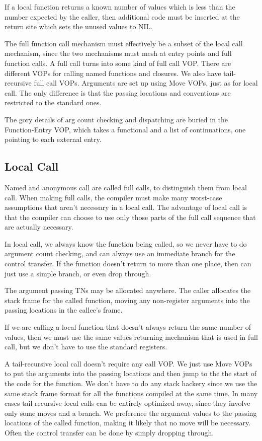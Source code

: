 {\begin{itemize, spread 0, spacing 1}
If a local function returns a known number of values which is less than the
number expected by the caller, then additional code must be inserted at the
return site which sets the unused values to NIL.

The full function call mechanism must effectively be a subset of the local call
mechanism, since the two mechanisms must mesh at entry points and full function
calls.  A full call turns into some kind of full call VOP.  There are different
VOPs for calling named functions and closures.  We also have tail-recursive
full call VOPs.  Arguments are set up using Move VOPs, just as for local call.
The only difference is that the passing locations and conventions are
restricted to the standard ones.

The gory details of arg count checking and dispatching are buried in the
Function-Entry VOP, which takes a functional and a list of continuations, one
pointing to each external entry.


\subsection{Local Call}

Named and anonymous call are called full calls, to distinguish them from
local call.  When making full calls, the compiler must make many worst-case
assumptions that aren't necessary in a local call.  The advantage of local
call is that the compiler can choose to use only those parts of the full
call sequence that are actually necessary. 

In local call, we always know the function being called, so we never have
to do argument count checking, and can always use an immediate branch for
the control transfer.  If the function doesn't return to more than one
place, then can just use a simple branch, or even drop through.

The argument passing TNs may be allocated anywhere.  The caller allocates the
stack frame for the called function, moving any non-register arguments into the
passing locations in the callee's frame.

If we are calling a local function that doesn't always return the same
number of values, then we must use the same values returning mechanism that
is used in full call, but we don't have to use the standard registers.

A tail-recursive local call doesn't require any call VOP.  We just use Move
VOPs to put the arguments into the passing locations and then jump to the the
start of the code for the function.  We don't have to do any stack hackery
since we use the same stack frame format for all the functions compiled at the
same time.  In many cases tail-recursive local calls can be entirely optimized
away, since they involve only some moves and a branch.  We preference the
argument values to the passing locations of the called function, making it
likely that no move will be necessary.  Often the control transfer can be done
by simply dropping through.


\end{itemize, spread 0, spacing 1}}
